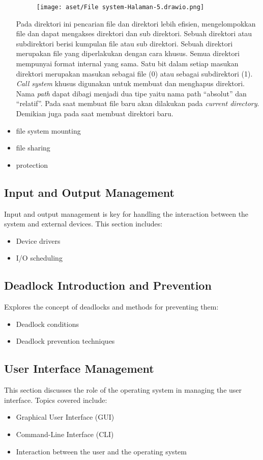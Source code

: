 \documentclass[12pt]{article}
\begin{document}
\begin{itemize}
		\begin{figure}[h!]
			\centering
			\texttt{[image: aset/File system-Halaman-5.drawio.png]}
			
		\end{figure}
		
		Pada direktori ini pencarian file dan direktori lebih efisien, mengelompokkan file dan dapat mengakses direktori dan sub direktori. Sebuah direktori atau subdirektori berisi kumpulan file atau sub direktori. Sebuah direktori merupakan file yang diperlakukan dengan cara khusus. Semua direktori mempunyai format internal yang sama. Satu bit dalam setiap masukan direktori merupakan masukan sebagai file (0) atau sebagai subdirektori (1). \textit{Call system} khusus digunakan untuk membuat dan menghapus direktori. Nama \textit{path} dapat dibagi menjadi dua tipe yaitu nama path “absolut” dan “relatif”. Pada saat membuat file baru akan dilakukan pada \textit{current directory}. Demikian juga pada saat membuat direktori baru.
		
		
		\item file system mounting
		\item file sharing
		\item protection
	\end{itemize}
	
	\subsection{Input and Output Management}
	Input and output management is key for handling the interaction between the system and external devices. This section includes:
	\begin{itemize}
		\item Device drivers
		\item I/O scheduling
	\end{itemize}
	
	\subsection{Deadlock Introduction and Prevention}
	Explores the concept of deadlocks and methods for preventing them:
	\begin{itemize}
		\item Deadlock conditions
		\item Deadlock prevention techniques
	\end{itemize}
	
	\subsection{User Interface Management}
	This section discusses the role of the operating system in managing the user interface. Topics covered include:
	\begin{itemize}
		\item Graphical User Interface (GUI)
		\item Command-Line Interface (CLI)
		\item Interaction between the user and the operating system
	\end{itemize}
	
\end{document}
